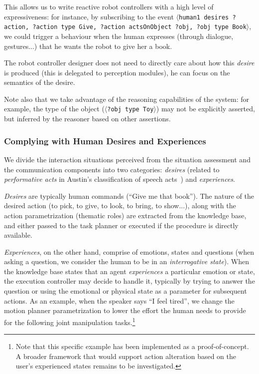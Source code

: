 \documentclass[preprint,3p,times]{elsarticle}
\newcommand{\stmt}[1]{{\footnotesize\tt$\langle$#1\relax$\rangle$}}
\begin{document}
This allows us to write reactive robot controllers with a high level of
expressiveness: for instance, by subscribing to the event \stmt{human1 desires
?action, ?action type Give, ?action actsOnObject ?obj, ?obj type Book}, we could
trigger a behaviour when the human expresses (through dialogue, gestures...)
that he wants the robot to give her a book.

The robot controller designer does not need to directly care about how this
\emph{desire} is produced (this is delegated to perception modules), he can
focus on the semantics of the desire.

Note also that we take advantage of the reasoning capabilities of the system:
for example, the type of the object (\stmt{?obj type Toy}) may not be
explicitly asserted, but inferred by the reasoner based on other assertions.

\subsubsection{Complying with Human Desires and Experiences}
\label{sect:desires}

We divide the interaction situations perceived from the situation assessment and
the communication components into two categories: \emph{desires} (related to
\emph{performative acts} in Austin's classification of speech
acts~\cite{Austin1962}) and \emph{experiences}.

\emph{Desires} are typically human commands (``Give me that book''). The nature of
the desired action (to pick, to give, to look, to bring, to show...), along with the action
parametrization (thematic roles) are extracted from the knowledge base, and
either passed to the task planner or executed if the procedure is directly
available.

\emph{Experiences}, on the other hand, comprise of emotions, states and
questions (when asking a question, we consider the human to be in an
\emph{interrogative state}). When the knowledge base states that an agent
\emph{experiences} a particular emotion or state, the execution controller may
decide to handle it, typically by trying to answer the question or using the
emotional or physical state as a parameter for subsequent actions. As an
example, when the speaker says ``I feel tired'', we change the motion planner
parametrization to lower the effort the human needs to provide for the following
joint manipulation tasks.\footnote{Note that this specific example has been
implemented as a proof-of-concept. A broader framework that would support
action alteration based on the user's experienced states remains to be investigated.}
\end{document}
